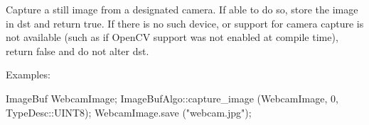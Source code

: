  
Capture a still image from a designated camera.  If able to do so,
store the image in {\cf dst} and return {\cf true}.  If there is no such device,
or support for camera capture is not available (such as if OpenCV
support was not enabled at compile time), return {\cf false} and do not
alter {\cf dst}.

\smallskip
\noindent Examples:
\begin{code}
    ImageBuf WebcamImage;
    ImageBufAlgo::capture_image (WebcamImage, 0, TypeDesc::UINT8);
    WebcamImage.save ("webcam.jpg");
\end{code}
\apiend




\begin{comment}
\apiitem{bool {\ce blah} (ImageBuf \&dst, const ImageBuf \&src, \\
        \bigspc  ROI roi=ROI::All(), int nthreads=0)}
\index{ImageBufAlgo!blah} \indexapi{blah}
Blah.
\smallskip
\noindent Examples:
\begin{code}
\end{code}
\apiend
\end{comment}


\chapwidthend
